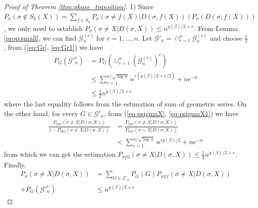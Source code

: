 \documentclass[entropy,article,submit,moreauthors,pdftex]{Definitions/mdpi}
\newcommand{\cG}{\mathcal{G}}
\newcommand{\1}{\mathbbm{1}}
\begin{document}
\begin{proof}[Proof of Theorem \ref{thm:phase_transition}]
	1) Since $P_{\sigma}(\sigma \not \in S_k(X)) = \sum_{f\in S_k} P_{\sigma}(\sigma \neq f(X) | D(\sigma, f(X))) P_{\sigma}(D(\sigma, f(X)))$,
	we only need to establish $P_{\sigma}(\sigma \neq X | D(\sigma, X)) \leq  n^{\tilde{g}(\beta)/2 + \epsilon}$.
	From Lemma \ref{prop:small}, we can find $\cG_n^{(r)}$ for $r=1,\dots, n$.
	Let $\cG'_n = \cap_{r=1}^n \cG_n^{(r)}$ and choose $\frac{\epsilon}{2}$, from (\ref{eq:Gr}, \ref{eq:Gr1}) we have
	\begin{align*}
	P_G(\cG'^c_n) &= P_G(\cup_{r=1}^n (\cG_n^{(r)})^c) \\
	&\leq \sum_{r=1}^{n/\sqrt{\log n } } n^{r(\tilde{g}(\beta)/2 + \epsilon/2)}  + n e^{-n} \\
	& \leq \frac{1}{2} n^{\tilde{g}(\beta)/2 + \epsilon}
	\end{align*}
	where the last equality follows from the estimation of sum of geometric series.
	On the other hand, for every $G \in \cG'_n$, from (\ref{eq:psigmaX}, \ref{eq:psigmaX1})
	we have
	\begin{align*}
	\frac{P_{\sigma | G}(\sigma \neq X | D(\sigma, X))}{1-P_{\sigma | G}(\sigma \neq X | D(\sigma, X))} &= \frac{P_{\sigma | G}(\sigma \neq X | D(\sigma, X))}{P_{\sigma|G}(\sigma=X | D(\sigma, X))} \\
	&< \sum_{r=1}^{n/\sqrt{\log n }}  n^{r\tilde{g}(\beta)/2} + n e^{-n}
	\end{align*}
	from which we can get the estimation $P_{\sigma | G}(\sigma \neq X | D(\sigma, X))\leq \frac{1}{2}n^{\tilde{g}(\beta)/2 + \epsilon}$.
	Finally, 
	\begin{align*}
	P_{\sigma}(\sigma \neq X|D(\sigma, X)) &= \sum_{G\in \cG'_n} P_G(G)P_{\sigma |G}(\sigma \neq X | D(\sigma, X)) \\
	+ P_G(\cG'^c_n)
	& \leq n^{\tilde{g}(\beta)/2 + \epsilon}
	\end{align*}
	

\end{proof}
\end{document}
